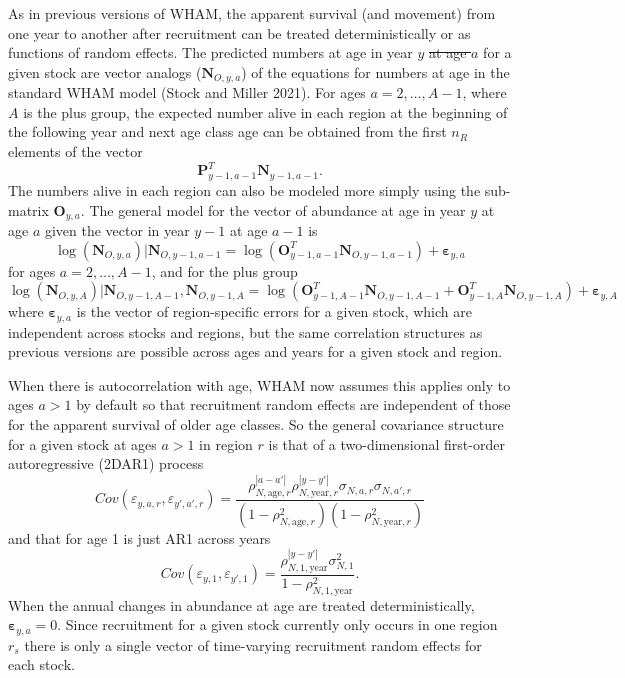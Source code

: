 \documentclass[
]{article}
\makeatletter
\providecommand{\DIFaddtex}[1]{{\protect\color{blue}\uwave{#1}}} %
\providecommand{\DIFdeltex}[1]{{\protect\color{red}\sout{#1}}} %
\providecommand{\DIFaddbegin}{} %
\providecommand{\DIFaddend}{} %
\providecommand{\DIFdelbegin}{} %
\providecommand{\DIFdelend}{} %
\providecommand{\DIFadd}[1]{\texorpdfstring{\DIFaddtex{#1}}{#1}} %
\providecommand{\DIFdel}[1]{\texorpdfstring{\DIFdeltex{#1}}{}} %
\newcommand{\DIFscaledelfig}{0.5}
\newlength{\DIFdelgraphicswidth} %
\newlength{\DIFdelgraphicsheight} %
\newcommand{\DIFaddincludegraphics}[2][]{{\color{blue}\fbox{\DIFOincludegraphics[#1]{#2}}}} %
\newcommand{\DIFdelincludegraphics}[2][]{%
\sbox{\DIFdelgraphicsbox}{\DIFOincludegraphics[#1]{#2}}%
\settoboxwidth{\DIFdelgraphicswidth}{\DIFdelgraphicsbox} %
\settoboxtotalheight{\DIFdelgraphicsheight}{\DIFdelgraphicsbox} %
\scalebox{\DIFscaledelfig}{%
\parbox[b]{\DIFdelgraphicswidth}{\usebox{\DIFdelgraphicsbox}\\[-\baselineskip] \rule{\DIFdelgraphicswidth}{0em}}\llap{\resizebox{\DIFdelgraphicswidth}{\DIFdelgraphicsheight}{%
\setlength{\unitlength}{\DIFdelgraphicswidth}%
\begin{picture}(1,1)%
\thicklines\linethickness{2pt} %
{\color[rgb]{1,0,0}\put(0,0){\framebox(1,1){}}}%
{\color[rgb]{1,0,0}\put(0,0){\line( 1,1){1}}}%
{\color[rgb]{1,0,0}\put(0,1){\line(1,-1){1}}}%
\end{picture}%
}\hspace*{3pt}}} %
} %
\DeclareRobustCommand{\DIFaddbegin}{\DIFOaddbegin \let\includegraphics\DIFaddincludegraphics} %
\DeclareRobustCommand{\DIFaddend}{\DIFOaddend \let\includegraphics\DIFOincludegraphics} %
\DeclareRobustCommand{\DIFdelbegin}{\DIFOdelbegin \let\includegraphics\DIFdelincludegraphics} %
\DeclareRobustCommand{\DIFdelend}{\DIFOaddend \let\includegraphics\DIFOincludegraphics} %
\let\sout@orig\sout %
\renewcommand{\sout}[1]{\ifmmode\text{\sout@orig{\ensuremath{#1}}}\else\sout@orig{#1}\fi} %
\makeatother
\begin{document}
As in previous versions of WHAM, the apparent survival (and movement) from one year to another after recruitment can be treated deterministically or as functions of random effects. The predicted numbers at age \DIFaddbegin \DIFadd{\(a\) }\DIFaddend in year \(y\) \DIFdelbegin \DIFdel{at age \(a\) }\DIFdelend for a given stock are vector analogs (\(\mathbf{N}_{O,y,a}\)) of the equations for numbers at age in the standard WHAM model (Stock and Miller 2021). For ages \(a = 2,\ldots, A-1\), where \(A\) is the plus group, the expected number alive in each region at the beginning of the following year and next age class age can be obtained from the first \(n_R\) elements of the vector
\[\mathbf{P}_{y-1,a-1}^T \mathbf{N}_{y-1,a-1}.\]
The numbers alive in each region can also be modeled more simply using the sub-matrix \(\mathbf{O}_{y,a}\). The general model for the vector of abundance at age in year \(y\) at age \(a\) given the vector in year \(y-1\) at age \(a-1\) is
\begin{equation*}
\log\left(\mathbf{N}_{O,y,a}\right)|\mathbf{N}_{O,y-1,a-1} =  \log\left(\mathbf{O}_{y-1,a-1}^T \mathbf{N}_{O,y-1,a-1}\right) + \boldsymbol{\varepsilon}_{y,a}
\end{equation*}
for ages \(a = 2,\ldots, A-1\), and for the plus group
\begin{equation*}
\log\left(\mathbf{N}_{O,y,A}\right)|\mathbf{N}_{O,y-1,A-1},\mathbf{N}_{O,y-1,A} = \log\left(\mathbf{O}_{y-1,A-1}^T \mathbf{N}_{O,y-1,A-1} + \mathbf{O}_{y-1,A}^T \mathbf{N}_{O,y-1,A}\right) + \boldsymbol{\varepsilon}_{y,A}
\end{equation*}
where \(\boldsymbol{\varepsilon}_{y,a}\) is the vector of region-specific errors for a given stock, which are independent across stocks and regions, but the same correlation structures as previous versions are possible across ages and years for a given stock and region.

When there is autocorrelation with age, WHAM now assumes this applies only to ages \(a>1\) by default so that recruitment random effects are independent of those for the apparent survival of older age classes. So the general covariance structure for a given stock at ages \(a>1\) in region \(r\) is that of a two-dimensional first-order autoregressive (2DAR1) process
\begin{equation*}
  Cov\left(\varepsilon_{y,a,r},\varepsilon_{y',a',r}\right) =   \frac{\rho_{N,\text{age},r}^{|a-a'|}\rho_{N,\text{year},r}^{|y-y'|}\sigma_{N,a,r}\sigma_{N,a',r}}{\left(1 -  \rho_{N,\text{age},r}^2\right)\left(1 - \rho_{N,\text{year},r}^2\right)} 
\end{equation*}
and that for age 1 is just AR1 across years
\begin{equation*}
  Cov\left(\varepsilon_{y,1},\varepsilon_{y',1}\right) =   \frac{\rho_{N,1,\text{year}}^{|y-y'|}\sigma^2_{N,1}}{1 - \rho_{N,1,\text{year}}^2}.
\end{equation*}
When the annual changes in abundance at age are treated deterministically, \(\boldsymbol{\varepsilon}_{y,a} = 0\). Since recruitment for a given stock currently only occurs in one region \(r_s\) there is only a single vector of time-varying recruitment random effects for each stock.
\end{document}

